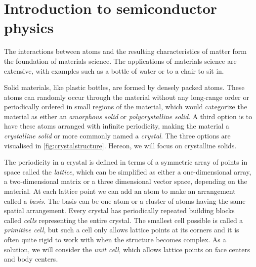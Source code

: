 \section{Introduction to semiconductor physics}

The interactions between atoms and the resulting characteristics of matter form the foundation of materials science. The applications of materials science are extensive, with examples such as a bottle of water or to a chair to sit in.



Solid materials, like plastic bottles, are formed by densely packed atoms. These atoms can randomly occur through the material without any long-range order or periodically ordered in small regions of the material, which would categorize the material as either an \textit{amorphous solid} or \textit{polycrystalline solid}. %
A third option is to have these atoms arranged with infinite periodicity, making the material a \textit{crystalline solid} or more commonly named a \textit{crystal}. The three options are visualised in \autoref{fig:crystalstructure}. Hereon, we will focus on crystalline solids.

The periodicity in a crystal is defined in terms of a symmetric array of points in space called the \textit{lattice}, which can be simplified as either a one-dimensional array, a two-dimensional matrix or a three dimensional vector space, depending on the material. At each lattice point we can add an atom to make an arrangement called a \textit{basis}. The basis can be one atom or a cluster of atoms having the same spatial arrangement. Every crystal has periodically repeated building blocks called \textit{cells} representing the entire crystal. The smallest cell possible is called a \textit{primitive cell}, but such a cell only allows lattice points at its corners and it is often quite rigid to work with when the structure becomes complex. As a solution, we will consider the \textit{unit cell}, which allows lattice points on face centers and body centers.

